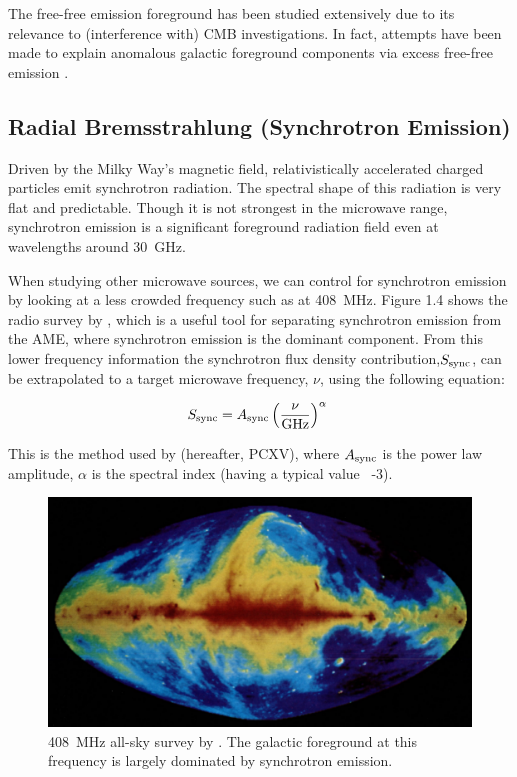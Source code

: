 The free-free emission foreground has been studied extensively due to its relevance to (interference with) CMB investigations. In fact, attempts have been made to explain anomalous galactic foreground components via excess free-free emission \cite{kogut96}.

\subsection{Radial Bremsstrahlung (Synchrotron Emission)}

Driven by the Milky Way’s magnetic field, relativistically accelerated charged particles emit synchrotron radiation. The spectral shape of this radiation is very flat and predictable. Though it is not strongest in the microwave range, synchrotron emission is a significant foreground radiation field even at wavelengths around 30~GHz. 

When studying other microwave sources, we can control for synchrotron emission by looking at a less crowded frequency such as at 408~MHz. Figure 1.4 shows the radio survey by \cite{haslam82}, which is a useful tool for separating synchrotron emission from the AME, where synchrotron emission is the dominant component. From this lower frequency information the synchrotron flux density contribution,$S_{\rm sync}$, can be extrapolated to a target microwave frequency, $\nu$, using the following equation:

\begin{equation}
S_{\rm sync} = A_{\rm sync} \left( \frac{\nu}{{\rm GHz}}\right)^{\alpha}~
\label{synchrotron}
\end{equation}

This is the method used by \cite{planckXV} (hereafter, PCXV), where $A_{\rm sync}$ is the power law amplitude, $\alpha$ is the spectral index (having a typical value ~-3).
  
\begin{figure}[htb!]
\begin{center}
\includegraphics[width=150mm]{EPS/haslam403.pdf}
\caption{
408~MHz all-sky survey by \cite{haslam82}. The galactic foreground at this frequency is largely dominated by synchrotron emission. 
 }
\label{Dust}
\end{center}
\end{figure}

